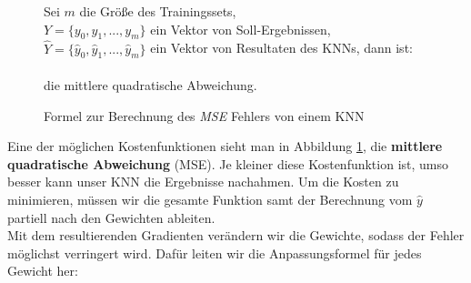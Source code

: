                 \begin{figure}[H]
                    \begin{mdframed}
                        \noindent
                        Sei $m$ die Größe des Trainingssets,\\
                        \hspace*{4.5mm} $Y = \{y_0, y_1,...,y_m\}$ ein Vektor von Soll-Ergebnissen, \\
                        \hspace*{4.5mm} $\widehat{Y} = \{\widehat{y}_0, \widehat{y}_1,...,\widehat{y}_m\}$ ein Vektor von Resultaten des KNNs, dann ist:\\[4mm]
                        \hspace*{30mm} \\[4mm]
                        die mittlere quadratische Abweichung.
                    \end{mdframed}
                    \caption{\label{cost-math} Formel zur Berechnung des \textit{MSE} Fehlers von einem KNN}
                \end{figure}
                \noindent
                Eine der möglichen Kostenfunktionen sieht man in Abbildung \ref{cost-math}, die \textbf{mittlere quadratische Abweichung} (MSE). Je kleiner diese Kostenfunktion ist, umso besser kann unser KNN die Ergebnisse nachahmen. Um die Kosten zu minimieren, müssen wir die gesamte Funktion samt der Berechnung vom $\widehat{y}$ partiell nach den Gewichten ableiten. \\[2mm]
                Mit dem resultierenden Gradienten verändern wir die Gewichte, sodass der Fehler möglichst verringert wird. Dafür leiten wir die Anpassungsformel für jedes Gewicht her:


